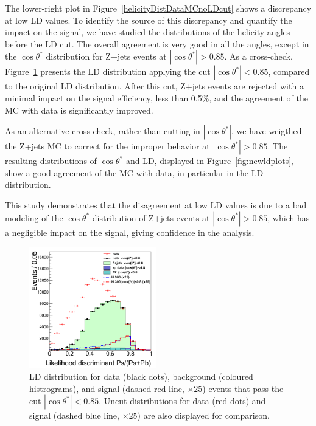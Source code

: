 

The lower-right plot in Figure~\ref{helicityDistDataMCnoLDcut} shows a discrepancy at low LD values.
To identify the source of this discrepancy and quantify the impact on the signal, we have studied
the distributions of the helicity angles before the LD cut. The overall agreement is very good in
all the angles, except in the $\cos\theta^\ast$ distribution for Z+jets events at
$|\cos\theta^\ast| > 0.85$. As a cross-check, Figure~\ref{fig:ctsarcut} presents the LD distribution
applying the cut $|\cos\theta^\ast| < 0.85$, compared to the original LD distribution.
After this cut, Z+jets events are rejected with a minimal impact on the signal efficiency, less than 0.5\%,
and the agreement of the MC with data is significantly improved. 

As an alternative cross-check, rather than cutting in $|\cos\theta^\ast|$, we have weigthed the Z+jets MC
to correct for the improper behavior at $|\cos\theta^\ast| > 0.85$. The resulting distributions 
of $\cos\theta^\ast$ and LD, displayed in Figure~\ref{fig:newldplots}, show a good agreement of the MC
with data, in particular in the LD distribution.

This study demonstrates that the disagreement at low LD values is due to a bad modeling of the
$\cos\theta^\ast$ distribution of Z+jets events at $|\cos\theta^\ast| > 0.85$,
which has a negligible impact on the signal, giving confidence in the analysis.
\begin{figure}[h]
\centering
\includegraphics[width=0.49\textwidth]{plots/LD_CUT_ctSTAR.png}
\caption{LD distribution for data (black dots), background (coloured histrograms), and
signal (dashed red line, $\times 25$) events that pass the cut  $|\cos\theta^\ast| < 0.85$.
Uncut distributions for data (red dots) and signal (dashed blue line, $\times 25$) are also
displayed for comparison.
}
\label{fig:ctsarcut}
\end{figure}

